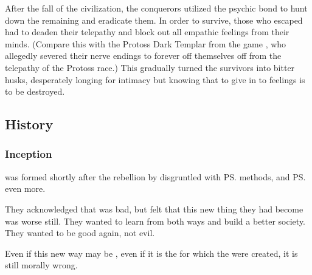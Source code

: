 After the fall of the \Kezeradi{} civilization, the conquerors utilized the psychic bond to hunt down the remaining \Kezeradi{} and eradicate them. In order to survive, those who escaped had to deaden their telepathy and block out all empathic feelings from their minds. 
(Compare this with the Protoss Dark Templar from the game \cite{VideoGame:Starcraft}, who allegedly severed their nerve endings to forever off themselves off from the telepathy of the Protoss race.) 
This gradually turned the survivors into bitter husks, desperately longing for intimacy but knowing that to give in to feelings is to be destroyed. 








\subsection{History}
\subsubsection{Inception}
\Kezerad{} was formed shortly after the \Merkyran{} rebellion by \resphain{} disgruntled with \ps{\Azraid}{} methods, and \ps{\Zachirah}{} even more. 

They acknowledged that \Merkyrah{} was bad, but felt that this new thing they had become was worse still. 
They wanted to learn from both ways and build a better society. 
They wanted to be good again, not evil. 


Even if this new way may be , even if it is the  for which the \resphain{} were created, it is still morally wrong. 

